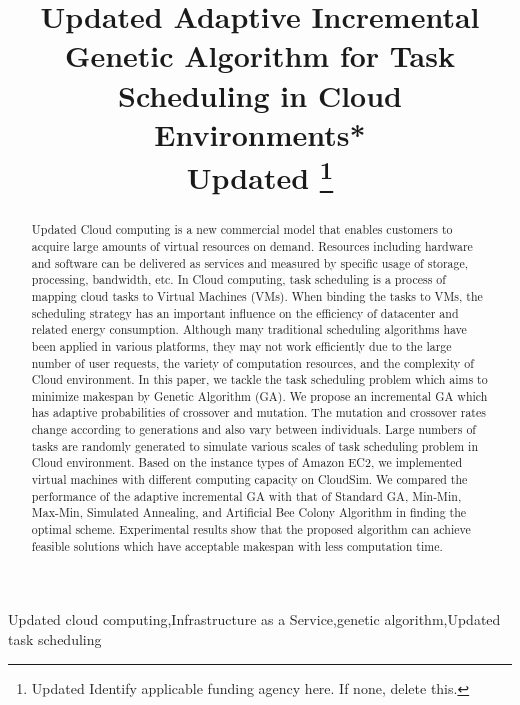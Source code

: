 \documentclass[conference]{IEEEtran}%
\begin{document}
%
\normalsize%
\title{Updated Adaptive Incremental Genetic Algorithm for Task Scheduling in Cloud Environments*\\
    {\footnotesize Updated}
    \thanks{Updated Identify applicable funding agency here. If none, delete this.}
    }%
\author{
}%
\maketitle%
\begin{abstract}%
Updated Cloud computing is a new commercial model that enables customers to acquire large amounts of virtual resources on demand. Resources including hardware and software can be delivered as services and measured by specific usage of storage, processing, bandwidth, etc. In Cloud computing, task scheduling is a process of mapping cloud tasks to Virtual Machines (VMs). When binding the tasks to VMs, the scheduling strategy has an important influence on the efficiency of datacenter and related energy consumption. Although many traditional scheduling algorithms have been applied in various platforms, they may not work efficiently due to the large number of user requests, the variety of computation resources, and the complexity of Cloud environment. In this paper, we tackle the task scheduling problem which aims to minimize makespan by Genetic Algorithm (GA). We propose an incremental GA which has adaptive probabilities of crossover and mutation. The mutation and crossover rates change according to generations and also vary between individuals. Large numbers of tasks are randomly generated to simulate various scales of task scheduling problem in Cloud environment. Based on the instance types of Amazon EC2, we implemented virtual machines with different computing capacity on CloudSim. We compared the performance of the adaptive incremental GA with that of Standard GA, Min{-}Min, Max{-}Min, Simulated Annealing, and Artificial Bee Colony Algorithm in finding the optimal scheme. Experimental results show that the proposed algorithm can achieve feasible solutions which have acceptable makespan with less computation time.%
\end{abstract}%
\begin{IEEEkeywords}%
Updated cloud computing,Infrastructure as a Service,genetic algorithm,Updated task scheduling%
\end{IEEEkeywords}%
\end{document}
